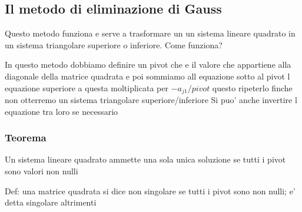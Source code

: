 \documentclass{article}
\begin{document}
\subsection{Il metodo di eliminazione di Gauss}
\begin{flushleft}
	Questo metodo funziona e serve a trasformare un un sistema lineare quadrato in un sistema triangolare
	superiore o inferiore. Come funziona?
\end{flushleft}
\begin{flushleft}
	In questo metodo dobbiamo definire un pivot che e il valore che appartiene
	alla diagonale della matrice quadrata e poi sommiamo all equazione sotto al pivot
	l equazione superiore a questa moltiplicata per $-a_{j1}/ pivot$ questo ripeterlo finche non otterremo un sistema triangolare superiore/inferiore
	Si puo' anche invertire l equazione tra loro se necessario
\end{flushleft}
\subsubsection{Teorema}
\begin{flushleft}
	Un sistema lineare quadrato ammette una sola unica soluzione se tutti i pivot sono valori non nulli
\end{flushleft}
\begin{flushleft}
	Def: una matrice quadrata si dice non singolare se tutti i pivot sono non nulli; e' detta singolare altrimenti
\end{flushleft}
\end{document}
